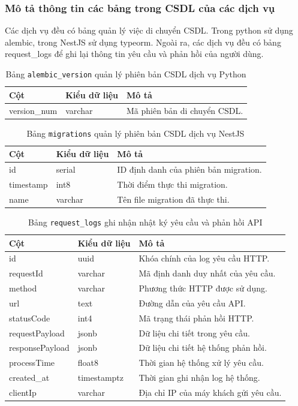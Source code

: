 \subsubsection{Mô tả thông tin các bảng trong CSDL của các dịch vụ}

Các dịch vụ đều có bảng quản lý việc di chuyển CSDL.
Trong python sử dụng alembic,
trong NestJS sử dụng typeorm.
Ngoài ra,
các dịch vụ đều có bảng
request\_logs
để ghi lại thông tin yêu cầu và phản hồi
của người dùng.

\begin{table}[H]
\centering
\begin{tabular}{|l|l|p{6cm}|}
\hline
\textbf{Cột} & \textbf{Kiểu dữ liệu} & \textbf{Mô tả} \\ \hline
version\_num & varchar & Mã phiên bản di chuyển CSDL. \\ \hline
\end{tabular}
\caption{Bảng \texttt{alembic\_version} quản lý phiên bản CSDL dịch vụ Python}
\end{table}

\begin{table}[H]
\centering
\begin{tabular}{|l|l|p{6cm}|}
\hline
\textbf{Cột} & \textbf{Kiểu dữ liệu} & \textbf{Mô tả} \\ \hline
id & serial & ID định danh của phiên bản migration. \\ \hline
timestamp & int8 & Thời điểm thực thi migration. \\ \hline
name & varchar & Tên file migration đã thực thi. \\ \hline
\end{tabular}
\caption{Bảng \texttt{migrations} quản lý phiên bản CSDL dịch vụ NestJS}
\end{table}

\begin{table}[H]
\centering
\begin{tabular}{|l|l|p{6cm}|}
\hline
\textbf{Cột} & \textbf{Kiểu dữ liệu} & \textbf{Mô tả} \\ \hline
id & uuid & Khóa chính của log yêu cầu HTTP. \\ \hline
requestId & varchar & Mã định danh duy nhất của yêu cầu. \\ \hline
method & varchar & Phương thức HTTP được sử dụng. \\ \hline
url & text & Đường dẫn của yêu cầu API. \\ \hline
statusCode & int4 & Mã trạng thái phản hồi HTTP. \\ \hline
requestPayload & jsonb & Dữ liệu chi tiết trong yêu cầu. \\ \hline
responsePayload & jsonb & Dữ liệu chi tiết hệ thống phản hồi. \\ \hline
processTime & float8 & Thời gian hệ thống xử lý yêu cầu. \\ \hline
created\_at & timestamptz & Thời gian ghi nhận log hệ thống. \\ \hline
clientIp & varchar & Địa chỉ IP của máy khách gửi yêu cầu. \\ \hline
\end{tabular}
\caption{Bảng \texttt{request\_logs} ghi nhận nhật ký yêu cầu và phản hồi API}
\end{table}








